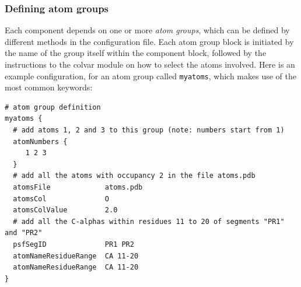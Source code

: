 \subsubsection{Defining atom groups}
\label{sec:colvar_atom_groups}
Each component depends on one or more \emph{atom groups}, which can be
defined by different methods in the configuration file.  Each atom
group block is initiated by the name of the group itself within the
component block, followed by the instructions to the colvar module on
how to select the atoms involved.  Here is an example configuration,
for an atom group called \texttt{myatoms}, which makes use of the most
common keywords:
\begin{verbatim}
# atom group definition
myatoms {
  # add atoms 1, 2 and 3 to this group (note: numbers start from 1)
  atomNumbers {
     1 2 3
  }
  # add all the atoms with occupancy 2 in the file atoms.pdb
  atomsFile             atoms.pdb
  atomsCol              O
  atomsColValue         2.0
  # add all the C-alphas within residues 11 to 20 of segments "PR1" and "PR2"
  psfSegID              PR1 PR2
  atomNameResidueRange  CA 11-20
  atomNameResidueRange  CA 11-20
}
\end{verbatim}

